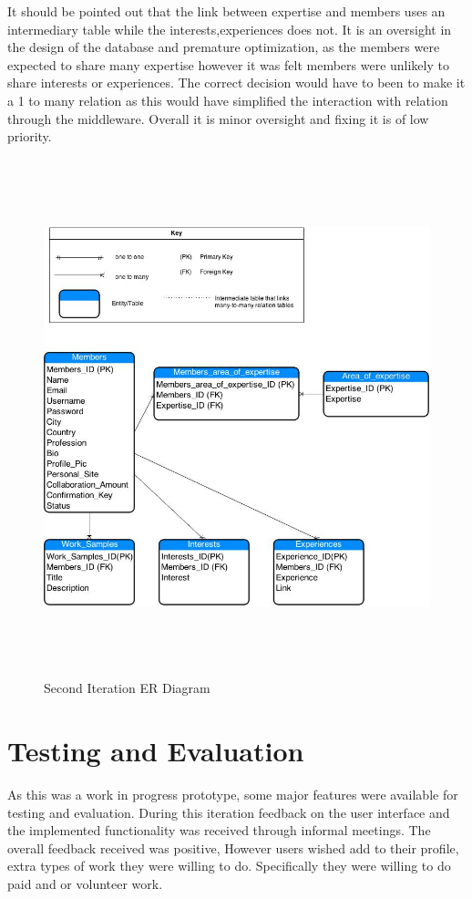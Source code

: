 \documentclass[a4paper,oneside,11pt]{report}
\begin{document}
It should be pointed out that the link between expertise and members uses an intermediary table while the interests,experiences does not. It is an oversight in the design of the database and premature optimization, as the members were expected to share many expertise however it was felt members were unlikely to share interests or experiences. The correct decision would have to been to make it a 1 to many relation as this would have simplified the interaction with relation through the middleware. Overall it is minor oversight and fixing it is of low priority.
\pagebreak			
\begin{figure}[!ht]
\centering
\includegraphics[width=\textwidth,height=15cm]{second-iteration-er-diagram.jpg}
\caption{Second Iteration ER Diagram}
\end{figure}
\section{Testing and Evaluation}
As this was a work in progress prototype, some major features were available for testing and evaluation. During this iteration feedback on the user interface and the implemented functionality was received through informal meetings. The overall feedback received was positive, However users wished add to their profile, extra types of work they were willing to do. Specifically they were willing to do paid and or volunteer work.
\end{document}
